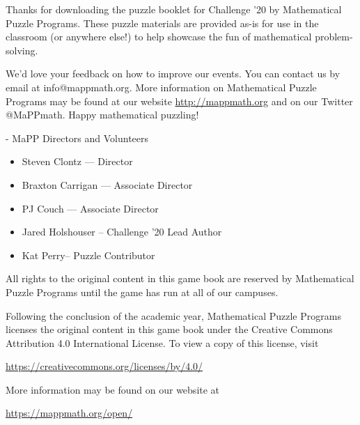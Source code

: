 Thanks for downloading the puzzle booklet for Challenge '20 by
Mathematical Puzzle Programs.  These puzzle materials are provided as-is for use
in the classroom (or anywhere else!)  to help showcase the fun of mathematical
problem-solving.

We'd love your feedback on how to improve our events. 
You can contact us by email at info@mappmath.org.
More information on Mathematical Puzzle Programs may be found at our website
\url{http://mappmath.org} and on our Twitter @MaPPmath. Happy mathematical puzzling!

- MaPP Directors and Volunteers

  \begin{itemize}
    \item Steven Clontz --- Director
    \item Braxton Carrigan --- Associate Director
    \item PJ Couch --- Associate Director
    \item Jared Holshouser -- Challenge '20 Lead Author
    \item Kat Perry-- Puzzle Contributor
  \end{itemize}


All rights to the original content in this game book are reserved by
Mathematical Puzzle Programs until the game has run at all of our campuses.

Following the conclusion of the academic year,
Mathematical Puzzle Programs licenses the original content in this game book
under the Creative Commons Attribution 4.0
International License. To view a copy of this license, visit

\begin{center}
  \url{https://creativecommons.org/licenses/by/4.0/}
\end{center}

More information may be found on our website at

\begin{center}
  \url{https://mappmath.org/open/}
\end{center}
